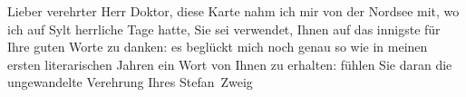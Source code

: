            \vspace{1em}
\pstart
           \noindent{}{\pb}Lieber verehrter Herr
                  Doktor, diese Karte nahm ich mir von der Nordsee mit, wo ich auf Sylt herrliche Tage
               hatte, Sie sei verwendet, Ihnen auf das innigste für Ihre guten Worte zu danken: es
               beglückt mich noch genau so wie in meinen ersten literarischen Jahren ein Wort von
               Ihnen zu erhalten: fühlen Sie daran die ungewandelte Verehrung Ihres\pend
           \pstart \spacefill\mbox{Stefan Zweig}\pend{}\endnumbering{}  \newcommand{\dateiname}{L03666}\newcommand{\titel}{Stefan Zweig an Arthur Schnitzler, [11. oder 12]. 7. 1923}\newcommand{\editorInnen}{Selma Jahnke und Martin Anton Müller}
